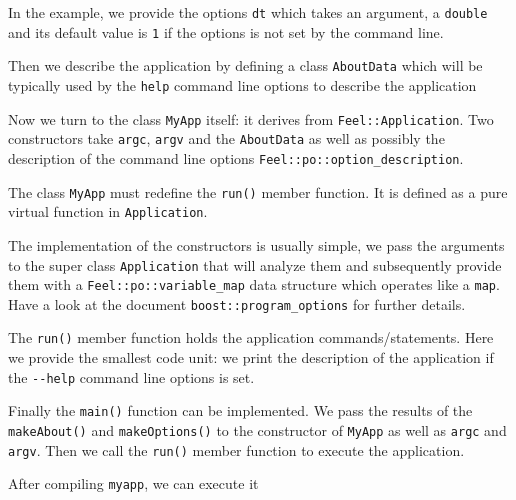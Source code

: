 \documentclass[a4paper]{book}
\begin{document}


In the example, we provide the options \lstinline!dt! which takes an
argument, a \lstinline!double! and its default value is \lstinline!1!
if the options is not set by the command line.

Then we describe the application by defining a class
\lstinline!AboutData! which will be typically used by the
\lstinline!help! command line options to describe the application





Now we turn to the class \lstinline!MyApp! itself: it derives from
\lstinline!Feel::Application!. Two constructors take \lstinline!argc!,
\lstinline!argv! and the \lstinline!AboutData! as well as possibly the
description of the command line options \lstinline!Feel::po::option_description!.

The class \lstinline!MyApp! must redefine the \lstinline!run()! member
function. It is defined as a pure virtual function in
\lstinline!Application!.




The implementation of the constructors is usually simple, we pass the
arguments to the super class \lstinline!Application! that will analyze
them and subsequently provide them with a
\lstinline!Feel::po::variable_map! data structure which operates like
a \lstinline!map!. Have a look at the document
\lstinline!boost::program_options! for further details.



The \lstinline!run()! member function holds the application
commands/statements. Here we provide the smallest code unit: we print
the description of the application if the \lstinline!--help! command
line options is set.



Finally the \lstinline!main()! function can be implemented. We pass
the results of the \lstinline!makeAbout()! and
\lstinline!makeOptions()! to the constructor of \lstinline!MyApp! as
well as \lstinline!argc! and \lstinline!argv!. Then we call the
\lstinline!run()! member function to execute the application.



After compiling \lstinline!myapp!, we can execute it
\end{document}
